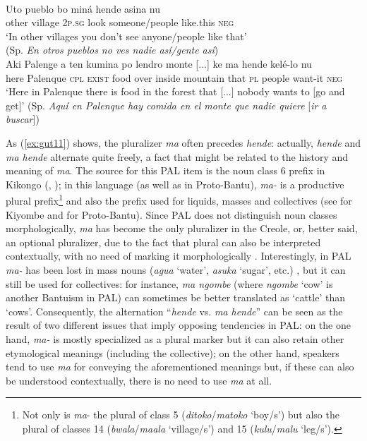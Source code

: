 \documentclass[output=paper,colorlinks,citecolor=brown]{langscibook}
\begin{document}
\ea\label{ex:gut10}\citep[287]{MagliaMoñino2015}\\
\gll Uto pueblo bo miná hende asina nu \\ 
other village 2\textsc{p.sg} look someone/people like.this \textsc{neg} \\
\glt ‘In other villages you don’t see anyone/people like that’ \\
(Sp. \textit{En otros pueblos no ves nadie así/gente así})
\ex\label{ex:gut11}\citep[288]{MagliaMoñino2015}\\
\gll Aki Palenge a ten kumina po lendro monte [...] ke ma hende kelé-lo nu \\
here Palenque \textsc{cpl} \textsc{exist} food over inside mountain {} that \textsc{pl} people want-it \textsc{neg} \\ 
\glt ‘Here in Palenque there is food in the forest that [...] nobody wants to [go and get]’
(Sp. \textit{Aquí en Palenque hay comida en el monte que nadie quiere} [\textit{ir a buscar}]) 
\z

As (\ref{ex:gut11}) shows, the pluralizer \textit{ma} often precedes \textit{hende}: actually, \textit{hende} and \textit{ma hende} alternate quite freely, a fact that might be related to the history and meaning of \textit{ma}. The source for this PAL item is the noun class 6 prefix in Kikongo (\cite{Schwegler2007}, \cite{Moñino2013}); in this language (as well as in Proto-Bantu), \textit{ma-} is a productive plural prefix\footnote{Not only is \textit{ma}- the plural of class 5 (\textit{ditoko}/\textit{matoko} ‘boy/s’) but also the plural of classes 14 (\textit{bwala}/\textit{maala} ‘village/s’) and 15 (\textit{kulu}/\textit{malu} ‘leg/s’).} and also the prefix used for liquids, masses and collectives (see \citealt[108--109]{Chicuna2018} for Kiyombe and \cite[51]{Maho1999} for Proto-Bantu). Since PAL does not distinguish noun classes morphologically, \textit{ma} has become the only pluralizer in the Creole, or, better said, an optional pluralizer, due to the fact that plural can also be interpreted contextually, with no need of marking it morphologically  \citep[42--43]{Moñino2013}. Interestingly, in PAL \textit{ma-} has been lost in mass nouns (\textit{agua} ‘water’, \textit{asuka} ‘sugar’, etc.) \citep[56--57]{Moñino2013}, but it can still be used for collectives: for instance, \textit{ma ngombe} (where \textit{ngombe} ‘cow’ is another Bantuism in PAL) can sometimes be better translated as ‘cattle’ than ‘cows’. Consequently, the alternation “\textit{hende} vs. \textit{ma hende}” can be seen as the result of two different issues that imply opposing tendencies in PAL: on the one hand, \textit{ma-} is mostly specialized as a plural marker but it can also retain other etymological meanings (including the collective); on the other hand, speakers tend to use \textit{ma} for conveying the aforementioned meanings but, if these can also be understood contextually, there is no need to use \textit{ma} at all.
\end{document}
